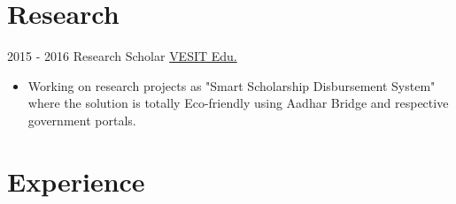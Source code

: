 \documentclass[letterpaper]{twentysecondcv} %
\begin{document}
\section{Research}
\begin{twenty}
	\twentyitem
    	{2015 - 2016}
        { Research Scholar }
        {\href{http://www.ves.ac.in/}{VESIT Edu.}}
        {}
        {
        {\begin{itemize}
        \item Working on research projects as "Smart Scholarship Disbursement System" where the solution is totally Eco-friendly using Aadhar Bridge and respective government portals.
    \end{itemize}}
        }
\end{twenty}


\section{Experience}
\end{document}
